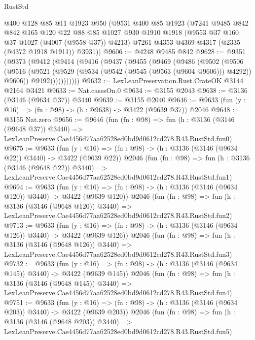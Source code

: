 \begin{lexlean}{RustStd}
\begin{coremodule}
    @400
    @128
    @85
    @11
    @1923
    @950
    (@9531
      @400
      @85
      @1923
      (@7241
        @9485
        @842
        @842
        @165
        @120
        @22
        @88
        @85
        @1027
        @930
        @1910
        @1918
        (@9553 @37 @160 @37 @1027 (@4007 (@9558 @37)) @4213)
        @7261
        @4353
        @4369
        @4317
        (@2335 (@4372 @1918 @1911))
        @3931))
@9606 := @4248 @9485 @842
@9628 := @9351
    (@9373
      (@9412
        (@9414
          (@9416
            (@9437
              (@9455
                (@9469
                  (@9486
                    (@9502
                      (@9506
                        (@9516
                          (@9521 (@9529 (@9534 (@9542 (@9545 (@9563 (@9604 @9606))) @4292)) @9606))
                          @9192)))))))))))
@9632 := LexLeanPreservation.Rust.CrateOK @3144 @2164 @3421
@9633 := Nat.casesOn.{0}
@9634 := @3155 @2043
@9638 := @3136 (@3146 (@9634 @37)) @3440
@9639 := @3155 @2040
@9646 := @9633 (fun (y : @16) => (fn : @98) -> (h : @9638) -> @3422 (@9639 @37)) @2046
@9648 := @3155 Nat.zero
@9656 := @9646
    (fun (fn : @98) =>
    fun (h : @3136 (@3146 (@9648 @37)) @3440) =>
    LexLeanPreserve.Cae4456d77aa62528ed0bd9d0612cd278.R43.RustStd.fun0)
@9675 := @9633
    (fun (y : @16) => (fn : @98) -> (h : @3136 (@3146 (@9634 @22)) @3440) -> @3422 (@9639 @22))
    @2046
    (fun (fn : @98) =>
    fun (h : @3136 (@3146 (@9648 @22)) @3440) =>
    LexLeanPreserve.Cae4456d77aa62528ed0bd9d0612cd278.R43.RustStd.fun1)
@9694 := @9633
    (fun (y : @16) => (fn : @98) -> (h : @3136 (@3146 (@9634 @120)) @3440) -> @3422 (@9639 @120))
    @2046
    (fun (fn : @98) =>
    fun (h : @3136 (@3146 (@9648 @120)) @3440) =>
    LexLeanPreserve.Cae4456d77aa62528ed0bd9d0612cd278.R43.RustStd.fun2)
@9713 := @9633
    (fun (y : @16) => (fn : @98) -> (h : @3136 (@3146 (@9634 @126)) @3440) -> @3422 (@9639 @126))
    @2046
    (fun (fn : @98) =>
    fun (h : @3136 (@3146 (@9648 @126)) @3440) =>
    LexLeanPreserve.Cae4456d77aa62528ed0bd9d0612cd278.R43.RustStd.fun3)
@9732 := @9633
    (fun (y : @16) => (fn : @98) -> (h : @3136 (@3146 (@9634 @145)) @3440) -> @3422 (@9639 @145))
    @2046
    (fun (fn : @98) =>
    fun (h : @3136 (@3146 (@9648 @145)) @3440) =>
    LexLeanPreserve.Cae4456d77aa62528ed0bd9d0612cd278.R43.RustStd.fun4)
@9751 := @9633
    (fun (y : @16) => (fn : @98) -> (h : @3136 (@3146 (@9634 @203)) @3440) -> @3422 (@9639 @203))
    @2046
    (fun (fn : @98) =>
    fun (h : @3136 (@3146 (@9648 @203)) @3440) =>
    LexLeanPreserve.Cae4456d77aa62528ed0bd9d0612cd278.R43.RustStd.fun5)

\end{coremodule}
\end{lexlean}
